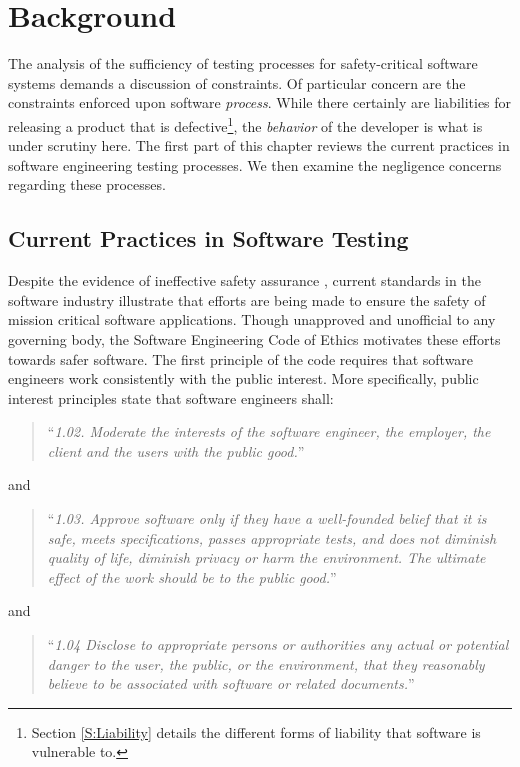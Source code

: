 \chapter{Background}\label{C:Background}
The analysis of the sufficiency of testing processes for safety-critical
software systems demands a discussion of constraints. Of particular concern are
the constraints enforced upon software \textit{process}. While there certainly
are liabilities for releasing a product that is defective\footnote{Section 
\ref{S:Liability} details the different forms of liability that software is
vulnerable to.}, the \textit{behavior} of the developer is what is under
scrutiny here. The first part of this chapter reviews the current practices in
software engineering testing processes. We then examine the negligence concerns
regarding these processes.

\section{Current Practices in Software Testing}
Despite the evidence of ineffective safety assurance \cite{Leveson93,Maisel05},
current standards in the software industry illustrate that efforts are being
made to ensure the safety of mission critical software applications. Though
unapproved and unofficial to any governing body, the Software Engineering Code
of Ethics motivates these efforts towards safer software. The first principle of
the code requires that software engineers work consistently with the public
interest. More specifically, public interest principles state that software
engineers shall: 

\begin{quote}
``\textit{1.02. Moderate the interests of the software engineer, the
employer, the client and the users with the public good.}''\cite{SECODE}
\end{quote}
and
\begin{quote}
``\textit{1.03. Approve software only if they have a well-founded belief that it
is safe, meets specifications, passes appropriate tests, and does not diminish
quality of life, diminish privacy or harm the environment. The ultimate effect
of the work should be to the public good.}''\cite{SECODE}
\end{quote}
and
\begin{quote}
``\textit{1.04 Disclose to appropriate persons or authorities any actual or
potential danger to the user, the public, or the environment, that they
reasonably believe to be associated with software or related
documents.}''\cite{SECODE}
\end{quote}

